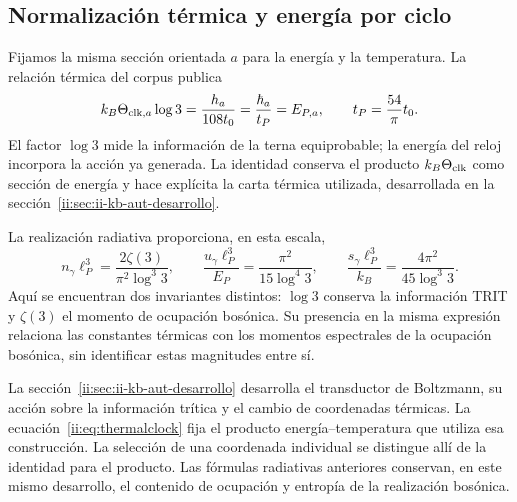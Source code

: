 \subsection{Normalización térmica y energía por ciclo}
Fijamos la misma sección orientada \(a\) para la energía y la
temperatura. La relación térmica del corpus publica
\begin{equation}
k_B\Theta_{{\rm clk},a}\log3
=\frac{h_a}{108t_0}
=\frac{\hbar_a}{t_P}=E_{P,a},
\qquad t_P=\frac{54}{\pi}t_0.
\label{ii:eq:thermalclock}
\end{equation}
El factor $\log3$ mide la información de la terna equiprobable;
la energía del reloj incorpora la acción ya generada.
La identidad conserva el producto $k_B\Theta_{\rm clk}$ como sección
de energía y hace explícita la carta térmica utilizada, desarrollada en la sección~\ref{ii:sec:ii-kb-aut-desarrollo}.

La realización radiativa proporciona, en esta escala,
\[
n_\gamma\ell_P^3=\frac{2\zeta(3)}{\pi^2\log^3 3},\qquad
\frac{u_\gamma\ell_P^3}{E_P}
=\frac{\pi^2}{15\log^4 3},\qquad
\frac{s_\gamma\ell_P^3}{k_B}
=\frac{4\pi^2}{45\log^3 3}.
\]
Aquí se encuentran dos invariantes distintos: $\log3$ conserva la
información TRIT y $\zeta(3)$ el momento de ocupación bosónica.
Su presencia en la misma expresión relaciona las constantes térmicas
con los momentos espectrales de la ocupación bosónica, sin identificar
estas magnitudes entre sí.

La sección~\ref{ii:sec:ii-kb-aut-desarrollo} desarrolla el transductor
de Boltzmann, su acción sobre la información trítica y el cambio de
coordenadas térmicas. La ecuación~\eqref{ii:eq:thermalclock} fija el
producto energía--temperatura que utiliza esa construcción. La
selección de una coordenada individual se distingue allí de la
identidad para el producto. Las fórmulas radiativas anteriores
conservan, en este mismo desarrollo, el contenido de ocupación y
entropía de la realización bosónica.

